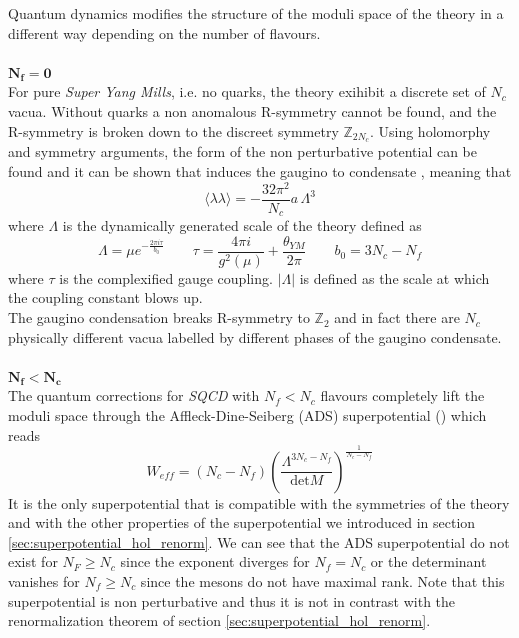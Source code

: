 Quantum dynamics modifies the structure of the moduli space of the theory in a different way depending on the number of flavours.
\\
\\
{$\mathbf{N_f= 0}$}\\
 For pure \emph{Super Yang Mills}, i.e. no quarks, the theory exihibit a discrete set of $N_c$ vacua. 
Without quarks a non anomalous R-symmetry cannot be found,
and the R-symmetry is broken down to the discreet symmetry $\mathbb{Z}_{2 N_c}$.
Using holomorphy and symmetry arguments, the form of the non perturbative potential can be found and it can be shown that induces the gaugino to condensate \cite{Veneziano:1982ah}, meaning that 
\begin{equation}
\langle \lambda \lambda \rangle = - \frac{32 \pi^2}{N_c} a \, \Lambda^3
\end{equation}
where $\Lambda$ is the dynamically generated scale of the theory defined as
\begin{equation}
\Lambda = \mu e^{-\frac{2 \pi i \tau}{b_0}} \qquad 
\tau  = \frac{4 \pi i}{g^2 (\mu) } + \frac{\theta_{YM}}{2 \pi}  \qquad b_0 = 3 N_c - N_f
\end{equation}
where $\tau$ is the complexified gauge coupling.
$|\Lambda|$ is defined as the scale at which the coupling constant blows up.\\
The gaugino condensation breaks R-symmetry to $\mathbb{Z}_2$ and in fact there are $N_c$ physically different vacua labelled by different phases of the gaugino condensate.
\\
\\
$\mathbf{ N_f < N_c}$\\
The quantum corrections for \emph{SQCD} with $N_f < N_c$ flavours completely lift the moduli space through the Affleck-Dine-Seiberg (ADS) superpotential (\cite{Davis:1983mz}\cite{Affleck:1983mk}) which reads
\begin{equation}
W_{eff} = \left( N_c - N_f  \right)\left( 
\frac{\Lambda^{3N_c -  N_f }}
{\mathrm{det} {M}}
\right)^{ \frac{1}{N_c - N_f}}
\end{equation}
It is the only superpotential that is compatible with the symmetries of the theory and with the other properties of the superpotential we introduced in section \ref{sec:superpotential_hol_renorm}.
We can see that the ADS superpotential do not exist for $N_F \geq N_c$ since the exponent diverges for $N_f = N_c$ or the determinant vanishes for $N_f \ge N_c$ since the mesons do not have maximal rank.
Note that this superpotential is non perturbative and thus it is not in contrast with the renormalization theorem of section \ref{sec:superpotential_hol_renorm}.

